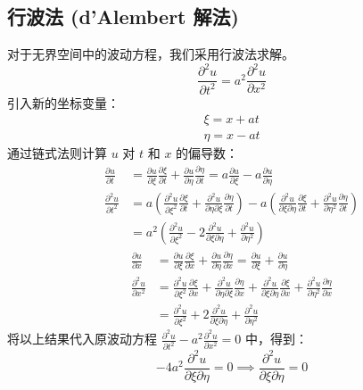 \documentclass{article}
\begin{document}
	\subsection{行波法 (d'Alembert 解法)}
	对于无界空间中的波动方程，我们采用行波法求解。
	$$
	\frac{\partial^2 u}{\partial t^2} = a^2 \frac{\partial^2 u}{\partial x^2}
	$$
	引入新的坐标变量：
	\begin{gather*}
		\xi = x + at \\
		\eta = x - at
	\end{gather*}
	通过链式法则计算 $u$ 对 $t$ 和 $x$ 的偏导数：
	\begin{align*}
		\frac{\partial u}{\partial t} &= \frac{\partial u}{\partial \xi}\frac{\partial \xi}{\partial t} + \frac{\partial u}{\partial \eta}\frac{\partial \eta}{\partial t} = a\frac{\partial u}{\partial \xi} - a\frac{\partial u}{\partial \eta} \\
		\frac{\partial^2 u}{\partial t^2} &= a\left(\frac{\partial^2 u}{\partial \xi^2}\frac{\partial \xi}{\partial t} + \frac{\partial^2 u}{\partial \eta \partial \xi}\frac{\partial \eta}{\partial t}\right) - a\left(\frac{\partial^2 u}{\partial \xi \partial \eta}\frac{\partial \xi}{\partial t} + \frac{\partial^2 u}{\partial \eta^2}\frac{\partial \eta}{\partial t}\right) \\
		&= a^2\left(\frac{\partial^2 u}{\partial \xi^2} - 2\frac{\partial^2 u}{\partial \xi \partial \eta} + \frac{\partial^2 u}{\partial \eta^2}\right)
	\end{align*}
	\begin{align*}
		\frac{\partial u}{\partial x} &= \frac{\partial u}{\partial \xi}\frac{\partial \xi}{\partial x} + \frac{\partial u}{\partial \eta}\frac{\partial \eta}{\partial x} = \frac{\partial u}{\partial \xi} + \frac{\partial u}{\partial \eta} \\
		\frac{\partial^2 u}{\partial x^2} &= \frac{\partial^2 u}{\partial \xi^2}\frac{\partial \xi}{\partial x} + \frac{\partial^2 u}{\partial \eta \partial \xi}\frac{\partial \eta}{\partial x} + \frac{\partial^2 u}{\partial \xi \partial \eta}\frac{\partial \xi}{\partial x} + \frac{\partial^2 u}{\partial \eta^2}\frac{\partial \eta}{\partial x} \\
		&= \frac{\partial^2 u}{\partial \xi^2} + 2\frac{\partial^2 u}{\partial \xi \partial \eta} + \frac{\partial^2 u}{\partial \eta^2}
	\end{align*}
	将以上结果代入原波动方程 $\frac{\partial^2 u}{\partial t^2} - a^2 \frac{\partial^2 u}{\partial x^2} = 0$ 中，得到：
	$$
	-4a^2 \frac{\partial^2 u}{\partial \xi \partial \eta} = 0 \implies \frac{\partial^2 u}{\partial \xi \partial \eta} = 0
	$$
\end{document}
